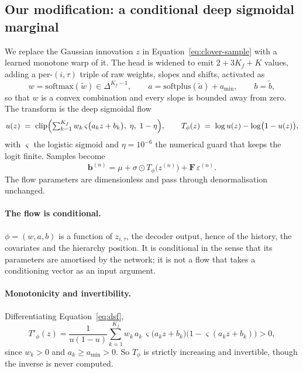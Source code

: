 \documentclass[11pt]{article}
\newcommand{\bvec}{\mathbf{b}}
\newcommand{\Fmat}{\mathbf{F}}
\begin{document}
\subsection{Our modification: a conditional deep sigmoidal marginal}

We replace the Gaussian innovation $z$ in Equation~\eqref{eq:clover-sample} with a
learned monotone warp of it. The head is widened to emit $2 + 3K_f + K$ values,
adding a per-$(i,\tau)$ triple of raw weights, slopes and shifts, activated as
\begin{equation}
w = \mathrm{softmax}(\tilde{w}) \in \Delta^{K_f-1},
\qquad
a = \mathrm{softplus}(\tilde{a}) + a_{\min},
\qquad
b = \tilde{b},
\end{equation}
so that $w$ is a convex combination and every slope is bounded away from zero.
The transform is the deep sigmoidal flow \citep{huang2018naf}
\begin{equation}
u(z) \;=\; \mathrm{clip}\Bigl(\textstyle\sum_{k=1}^{K_f} w_k\,
\varsigma\bigl(a_k z + b_k\bigr),\;\eta,\;1-\eta\Bigr),
\qquad
T_\phi(z) \;=\; \log u(z) - \log\bigl(1 - u(z)\bigr),
\label{eq:dsf}
\end{equation}
with $\varsigma$ the logistic sigmoid and $\eta = 10^{-6}$ the numerical guard that
keeps the logit finite. Samples become
\begin{equation}
\bvec^{(n)} = \mu + \sigma \odot T_\phi\bigl(z^{(n)}\bigr) + \Fmat\,\varepsilon^{(n)} .
\label{eq:flow-sample}
\end{equation}
The flow parameters are dimensionless and pass through denormalisation unchanged.

\paragraph{The flow is conditional.} $\phi = (w, a, b)$ is a function of
$z_{i,\tau}$, the decoder output, hence of the history, the covariates and the
hierarchy position. It is conditional in the sense that its parameters are amortised
by the network; it is not a flow that takes a conditioning vector as an input
argument.

\paragraph{Monotonicity and invertibility.} Differentiating
Equation~\eqref{eq:dsf},
\begin{equation}
T'_\phi(z) = \frac{1}{u(1-u)}\sum_{k=1}^{K_f} w_k\, a_k\,
\varsigma\bigl(a_k z + b_k\bigr)\bigl(1 - \varsigma(a_k z + b_k)\bigr) > 0 ,
\end{equation}
since $w_k > 0$ and $a_k \ge a_{\min} > 0$. So $T_\phi$ is strictly increasing and
invertible, though the inverse is never computed.
\end{document}

